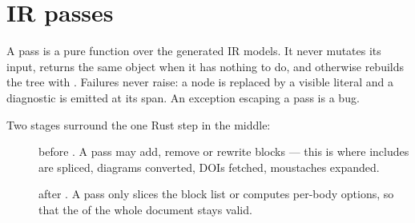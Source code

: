 \documentclass[a4paper,twoside]{article}
\begin{document}
\section{IR passes}
A pass is a pure function  over the
generated IR models. It never mutates its input, returns the same object when it
has nothing to do, and otherwise rebuilds the tree with .
Failures never raise: a node is replaced by a visible literal and a diagnostic
is emitted at its span. An exception escaping a pass is a bug.

Two stages surround the one Rust step in the middle:
\begin{description}
\item[{}] before . A  pass may add, remove or rewrite blocks --- this
is where includes are spliced, diagrams converted, DOIs fetched, moustaches
expanded.
\item[{}] after . A  pass only slices the block list or computes
per-body options, so that the  of the whole document stays valid.
\end{description}
\end{document}
